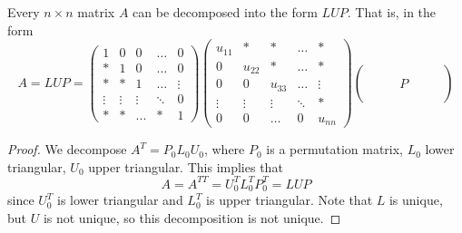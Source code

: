   \begin{corollary}
    Every $n \times n$ matrix $A$ can be decomposed into the form $L U P$. That is, in the form
    \begin{equation}
      A = L U P = 
      \begin{pmatrix}
      1 & 0 & 0 & \ldots & 0\\
      * & 1 & 0 & \ldots & 0\\
      * & * & 1 & \ldots & \vdots\\
      \vdots & \vdots & \vdots & \ddots & 0\\
      * & * & ... & * & 1 
      \end{pmatrix}
      \begin{pmatrix}
      u_{11} & * & * & \ldots & *\\
      0 & u_{22} & * & \ldots & *\\
      0 & 0 & u_{33} & \ldots & \vdots\\
      \vdots & \vdots & \vdots & \ddots & * \\
      0 & 0 & \ldots & 0 & u_{n n} 
      \end{pmatrix}
      \begin{pmatrix}
      \\
      \\
       & & & P & & & \\
      \\
       & 
      \end{pmatrix}
    \end{equation}
  \end{corollary}
  \begin{proof}
    We decompose $A^T = P_0 L_0 U_0$, where $P_0$ is a permutation matrix, $L_0$ lower triangular, $U_0$ upper triangular. This implies that 
    \begin{equation}
      A = A^{T T} = U_0^T L_0^T P_0^T = L U P
    \end{equation}
    since $U_0^T$ is lower triangular and $L_0^T$ is upper triangular. Note that $L$ is unique, but $U$ is not unique, so this decomposition is not unique. 
  \end{proof}

